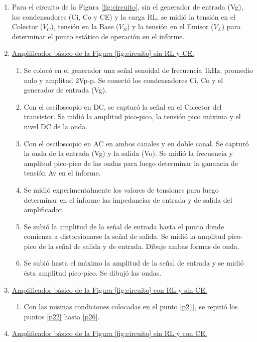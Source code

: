 \documentclass[12pt, a4paper]{article}
\begin{document}
    \begin{enumerate}
        \item Para el circuito de la Figura \ref{fig:circuito}, sin el generador de entrada (Vg), los condensadores (Ci, Co y CE) y la carga RL, se midió la tensión en el Colector ($V_C$), tensión en la Base ($V_B$) y la tensión en el Emisor ($V_E$) para determinar el punto estático de operación en el informe.
        \item \underline{Amplificador básico de la Figura \ref{fig:circuito} sin RL y CE.} \label{lab1}
        \begin{enumerate}
            \item Se colocó en el generador una señal senoidal de frecuencia 1kHz, promedio nulo y amplitud 2Vp-p. Se conectó los condensadores Ci, Co y el generador de entrada (Vg).\label{p21}
            \item Con el osciloscopio en DC, se capturó la señal en el Colector del transistor. Se midió la amplitud pico-pico, la tensión pico máxima y el nivel DC de la onda. \label{p22}
            \item Con el osciloscopio en AC en ambos canales y en doble canal. Se capturó la onda de la entrada (Vg) y la salida (Vo). Se midió la frecuencia y amplitud pico-pico de las ondas para luego determinar la ganancia de tensión Av en el informe.
            \item Se midió experimentalmente los valores de tensiones para luego determinar en el informe las impedancias de entrada y de salida del amplificador.
            \item Se subió la amplitud de la señal de entrada hasta el punto donde comienza a distorsionarse la señal de salida. Se midió la amplitud pico-pico de la señal de salida y de entrada. Dibuje ambas formas de onda.
            \item Se subió hasta el máximo la amplitud de la señal de entrada y se midió ésta amplitud pico-pico. Se dibujó las ondas. \label{p26}
        \end{enumerate}
        \item \underline{Amplificador básico de la Figura \ref{fig:circuito} con RL y sin CE.} \label{lab2}
        \begin{enumerate}
            \item Con las mismas condiciones colocadas en el punto \ref{p21}, se repitió los puntos \ref{p22} hasta \ref{p26}.
        \end{enumerate}
        \item \underline{Amplificador básico de la Figura \ref{fig:circuito} sin RL y con CE.} \label{lab3}

\end{enumerate}
\end{document}
